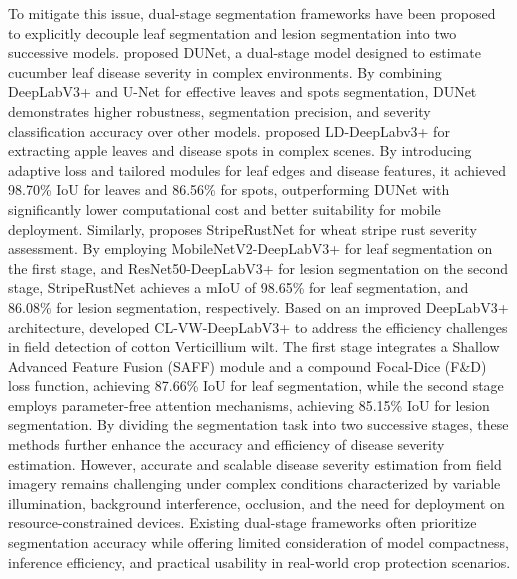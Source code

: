 \documentclass[
]{article}
\begin{document}
To mitigate this issue, dual-stage segmentation frameworks have been
proposed to explicitly decouple leaf segmentation and lesion
segmentation into two successive models. proposed DUNet, a dual-stage
model designed to estimate cucumber leaf disease severity in complex
environments. By combining DeepLabV3+ and U-Net for effective leaves and
spots segmentation, DUNet demonstrates higher robustness, segmentation
precision, and severity classification accuracy over other models.
proposed LD-DeepLabv3+ for extracting apple leaves and disease spots in
complex scenes. By introducing adaptive loss and tailored modules for
leaf edges and disease features, it achieved 98.70\% IoU for leaves and
86.56\% for spots, outperforming DUNet with significantly lower
computational cost and better suitability for mobile deployment.
Similarly, proposes StripeRustNet for wheat stripe rust severity
assessment. By employing MobileNetV2-DeepLabV3+ for leaf segmentation on
the first stage, and ResNet50-DeepLabV3+ for lesion segmentation on the
second stage, StripeRustNet achieves a mIoU of 98.65\% for leaf
segmentation, and 86.08\% for lesion segmentation, respectively. Based
on an improved DeepLabV3+ architecture, developed CL-VW-DeepLabV3+ to
address the efficiency challenges in field detection of cotton
Verticillium wilt. The first stage integrates a Shallow Advanced Feature
Fusion (SAFF) module and a compound Focal-Dice (F\&D) loss function,
achieving 87.66\% IoU for leaf segmentation, while the second stage
employs parameter-free attention mechanisms, achieving 85.15\% IoU for
lesion segmentation. By dividing the segmentation task into two
successive stages, these methods further enhance the accuracy and
efficiency of disease severity estimation. However, accurate and
scalable disease severity estimation from field imagery remains
challenging under complex conditions characterized by variable
illumination, background interference, occlusion, and the need for
deployment on resource-constrained devices. Existing dual-stage
frameworks often prioritize segmentation accuracy while offering limited
consideration of model compactness, inference efficiency, and practical
usability in real-world crop protection scenarios.
\end{document}
